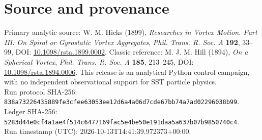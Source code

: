 \documentclass[10pt,a4paper]{article}
\begin{document}
\section*{Source and provenance}
Primary analytic source: W. M. Hicks (1899), \emph{Researches in Vortex Motion. Part III: On Spiral or Gyrostatic Vortex Aggregates}, \emph{Phil. Trans. R. Soc. A} \textbf{192}, 33--99, DOI: \href{https://doi.org/10.1098/rsta.1899.0002}{10.1098/rsta.1899.0002}. Classic reference: M. J. M. Hill (1894), \emph{On a Spherical Vortex}, \emph{Phil. Trans. R. Soc. A} \textbf{185}, 213--245, DOI: \href{https://doi.org/10.1098/rsta.1894.0006}{10.1098/rsta.1894.0006}. This release is an analytical Python control campaign, with no independent observational support for SST particle physics.\\
\footnotesize Run protocol SHA-256: \texttt{838a73226435889fe3cfee63053ee12d6a4a06d7cde67bb74a7ad02296038b99}.\\
Ledger SHA-256: \texttt{5283d44e0cf4a1ae4f514c6477169fac5e4be50e191daa5a637b07b9850740c4}.\\
Run timestamp (UTC): 2026-10-13T14:41:39.972373+00:00.
\end{document}
